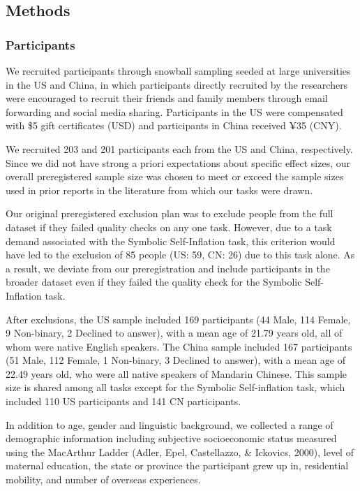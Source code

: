 \documentclass[
  man]{apa6}
\begin{document}
\hypertarget{methods}{%
\subsection{Methods}\label{methods}}

\hypertarget{participants}{%
\subsubsection{Participants}\label{participants}}

We recruited participants through snowball sampling seeded at large universities in the US and China, in which participants directly recruited by the researchers were encouraged to recruit their friends and family members through email forwarding and social media sharing. Participants in the US were compensated with \$5 gift certificates (USD) and participants in China received ¥35 (CNY).

We recruited 203 and 201 participants each from the US and China, respectively. Since we did not have strong a priori expectations about specific effect sizes, our overall preregistered sample size was chosen to meet or exceed the sample sizes used in prior reports in the literature from which our tasks were drawn.

Our original preregistered exclusion plan was to exclude people from the full dataset if they failed quality checks on any one task. However, due to a task demand associated with the Symbolic Self-Inflation task, this criterion would have led to the exclusion of 85 people (US: 59, CN: 26) due to this task alone. As a result, we deviate from our preregistration and include participants in the broader dataset even if they failed the quality check for the Symbolic Self-Inflation task.

After exclusions, the US sample included 169 participants (44 Male, 114 Female, 9 Non-binary, 2 Declined to answer), with a mean age of 21.79 years old, all of whom were native English speakers. The China sample included 167 participants (51 Male, 112 Female, 1 Non-binary, 3 Declined to answer), with a mean age of 22.49 years old, who were all native speakers of Mandarin Chinese. This sample size is shared among all tasks except for the Symbolic Self-inflation task, which included 110 US participants and 141 CN participants.

In addition to age, gender and linguistic background, we collected a range of demographic information including subjective socioeconomic status measured using the MacArthur Ladder (Adler, Epel, Castellazzo, \& Ickovics, 2000), level of maternal education, the state or province the participant grew up in, residential mobility, and number of overseas experiences.
\end{document}
